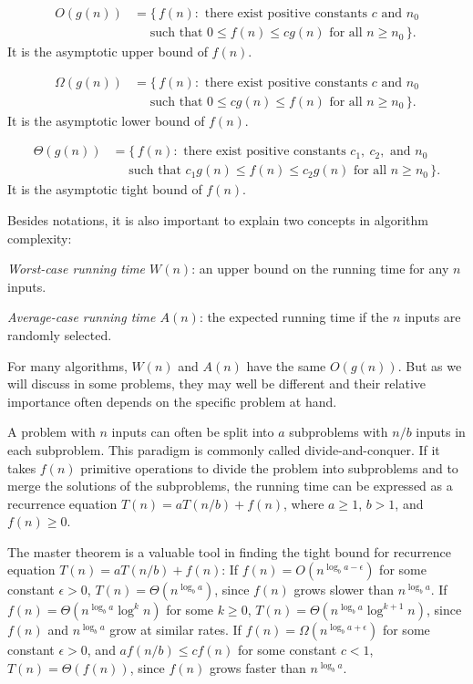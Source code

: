 \[
\begin{aligned}
O(g(n)) &= \{\,f(n):\text{ there exist positive constants }c\text{ and }n_0\\
&\quad\text{ such that }0\leq f(n)\leq cg(n)\text{ for all }n\geq n_0\,\}.
\end{aligned}
\]
It is the asymptotic upper bound of $f(n)$.

\[
\begin{aligned}
\Omega(g(n)) &= \{\,f(n):\text{ there exist positive constants }c\text{ and }n_0\\
&\quad\text{ such that }0\leq cg(n)\leq f(n)\text{ for all }n\geq n_0\,\}.
\end{aligned}
\]
It is the asymptotic lower bound of $f(n)$.

\[
\begin{aligned}
\Theta(g(n)) &= \{\,f(n):\text{ there exist positive constants }c_1,\ c_2,\text{ and }n_0\\
&\quad\text{ such that }c_1g(n)\leq f(n)\leq c_2g(n)\text{ for all }n\geq n_0\,\}.
\end{aligned}
\]
It is the asymptotic tight bound of $f(n)$.

Besides notations, it is also important to explain two concepts in algorithm complexity:


\emph{Worst-case running time $W(n)$}: an upper bound on the running time for any $n$ inputs.

\emph{Average-case running time $A(n)$}: the expected running time if the $n$ inputs are
randomly selected.

For many algorithms, $W(n)$ and $A(n)$ have the same $O(g(n))$. But as we will discuss
in some problems, they may well be different and their relative importance often
depends on the specific problem at hand.

A problem with $n$ inputs can often be split into $a$ subproblems with $n/b$ inputs in each
subproblem. This paradigm is commonly called divide-and-conquer. If it takes $f(n)$
primitive operations to divide the problem into subproblems and to merge the solutions
of the subproblems, the running time can be expressed as a recurrence equation
$T(n)=aT(n/b)+f(n)$, where $a\geq1$, $b>1$, and $f(n)\geq0$.

The master theorem is a valuable tool in finding the tight bound for recurrence equation
$T(n)=aT(n/b)+f(n)$: If $f(n)=O(n^{\log_b a-\epsilon})$ for some constant $\epsilon>0$,
$T(n)=\Theta(n^{\log_b a})$, since $f(n)$ grows slower than $n^{\log_b a}$. If
$f(n)=\Theta(n^{\log_b a}\log^k n)$ for some $k\geq0$,
$T(n)=\Theta(n^{\log_b a}\log^{k+1}n)$, since $f(n)$ and $n^{\log_b a}$ grow at
similar rates. If $f(n)=\Omega(n^{\log_b a+\epsilon})$ for some constant $\epsilon>0$,
and $af(n/b)\leq cf(n)$ for some constant $c<1$, $T(n)=\Theta(f(n))$, since $f(n)$
grows faster than $n^{\log_b a}$.

